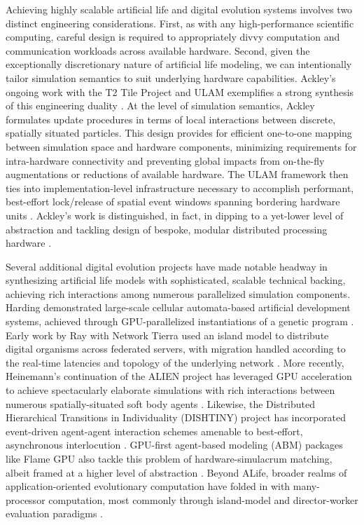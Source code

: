 Achieving highly scalable artificial life and digital evolution systems involves two distinct engineering considerations.
First, as with any high-performance scientific computing, careful design is required to appropriately divvy computation and communication workloads across available hardware.
Second, given the exceptionally discretionary nature of artificial life modeling, we can intentionally tailor simulation semantics to suit underlying hardware capabilities.
Ackley's ongoing work with the T2 Tile Project and ULAM exemplifies a strong synthesis of this engineering duality \citep{ackley2016ulam}.
At the level of simulation semantics, Ackley formulates update procedures in terms of local interactions between discrete, spatially situated particles.
This design provides for efficient one-to-one mapping between simulation space and hardware components, minimizing requirements for intra-hardware connectivity and preventing global impacts from on-the-fly augmentations or reductions of available hardware.
The ULAM framework then ties into implementation-level infrastructure necessary to accomplish performant, best-effort lock/release of spatial event windows spanning bordering hardware units \citep{ackley2013movable}.
Ackley's work is distinguished, in fact, in dipping to a yet-lower level of abstraction and tackling design of bespoke, modular distributed processing hardware \citep{ackley2011homeostatic,ackley2023robust,livingcomputationSFBSanta}.

Several additional digital evolution projects have made notable headway in synthesizing artificial life models with sophisticated, scalable technical backing, achieving rich interactions among numerous parallelized simulation components.
Harding demonstrated large-scale cellular automata-based artificial development systems, achieved through GPU-parallelized instantiations of a genetic program  \citep{harding2007fast_ieee}.
Early work by Ray with Network Tierra used an island model to distribute digital organisms across federated servers, with migration handled according to the real-time latencies and topology of the underlying network \citep{ray1995proposal}.
More recently, Heinemann's continuation of the ALIEN project has leveraged GPU acceleration to achieve spectacularly elaborate simulations with rich interactions between numerous spatially-situated soft body agents \citep{heinemann2008artificial}.
Likewise, the Distributed Hierarchical Transitions in Individuality (DISHTINY) project has incorporated event-driven agent-agent interaction schemes amenable to best-effort, asynchronous interlocution \citep{moreno2022exploring,moreno2021conduit}.
GPU-first agent-based modeling (ABM) packages like Flame GPU also tackle this problem of hardware-simulacrum matching, albeit framed at a higher level of abstraction \citep{richmond2010high}.
Beyond ALife, broader realms of application-oriented evolutionary computation have folded in with many-processor computation, most commonly through island-model and director-worker evaluation paradigms \citep{abdelhafez2019performance,cantu2001master}.


